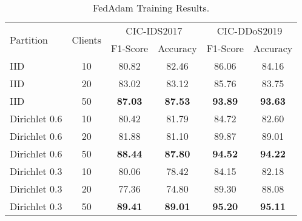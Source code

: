 \begin{table}[h]
    \caption{FedAdam Training Results.}
    \centering
    \begin{tabular}{l|c|c|c|c|c}
        \multirow{2}{*}{Partition} & \multirow{2}{*}{Clients} & \multicolumn{2}{|c|}{CIC-IDS2017} & \multicolumn{2}{|c}{CIC-DDoS2019} \\
        \cline{3-6} & & F1-Score & Accuracy & F1-Score & Accuracy \\
        \hline\hline
        IID & 10 & 80.82 & 82.46 & 86.06 & 84.16 \\
        IID & 20 & 83.02 & 83.12 & 85.76 & 83.75 \\
        IID & 50 & \textbf{87.03} & \textbf{87.53} & \textbf{93.89} & \textbf{93.63} \\
        Dirichlet 0.6 & 10 & 80.42 & 81.79 & 84.72 & 82.60 \\
        Dirichlet 0.6 & 20 & 81.88 & 81.10 & 89.87 & 89.01 \\
        Dirichlet 0.6 & 50 & \textbf{88.44} & \textbf{87.80} & \textbf{94.52} & \textbf{94.22} \\
        Dirichlet 0.3 & 10 & 80.06 & 78.42 & 84.15 & 82.18 \\
        Dirichlet 0.3 & 20 & 77.36 & 74.80 & 89.30 & 88.08 \\
        Dirichlet 0.3 & 50 & \textbf{89.41} & \textbf{89.01} & \textbf{95.20} & \textbf{95.11} \\
    \end{tabular}
    \label{tbl:fedadam_results}
\end{table}

